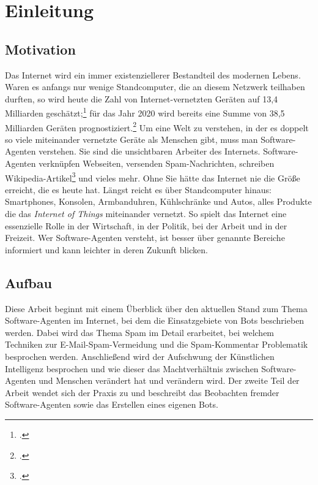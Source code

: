 \section{Einleitung}
\label{sec:einleitung}

\subsection{Motivation}
\label{sub:motivation}

Das Internet wird ein immer existenziellerer Bestandteil des modernen Lebens.
Waren es anfangs nur wenige Standcomputer, die an diesem Netzwerk teilhaben
durften, so wird heute die Zahl von Internet-vernetzten Geräten auf 13,4
Milliarden geschätzt;\footcite{iotTripleBy2020} für das Jahr 2020 wird bereits
eine Summe von 38,5 Milliarden Geräten
prognostiziert.\footcite{iotTripleBy2020} Um eine Welt zu verstehen, in der es
doppelt so viele miteinander vernetzte Geräte als Menschen gibt, muss man
Software-Agenten verstehen. Sie sind die unsichtbaren Arbeiter des Internets.
Software-Agenten verknüpfen Webseiten, versenden Spam-Nachrichten, schreiben
Wikipedia-Artikel\footcite{botWritingForWikipedia} und vieles mehr. Ohne Sie
hätte das Internet nie die Größe erreicht, die es heute hat. Längst reicht es
über Standcomputer hinaus: Smartphones, Konsolen, Armbanduhren, Kühlschränke
und Autos, alles Produkte die das \emph{Internet of Things} miteinander
vernetzt. So spielt das Internet eine essenzielle Rolle in der Wirtschaft, in
der Politik, bei der Arbeit und in der Freizeit. Wer Software-Agenten versteht,
ist besser über genannte Bereiche informiert und kann leichter in deren Zukunft
blicken.

\subsection{Aufbau}
\label{sub:aufbau}

Diese Arbeit beginnt mit einem Überblick über den aktuellen Stand zum Thema
Software-Agenten im Internet, bei dem die Einsatzgebiete von
Bots beschrieben werden. Dabei wird
das Thema Spam im Detail erarbeitet, bei welchem Techniken
zur E-Mail-Spam-Vermeidung und die
Spam-Kommentar Problematik besprochen werden.
Anschließend wird der Aufschwung der Künstlichen Intelligenz
besprochen und wie dieser das
Machtverhältnis zwischen Software-Agenten und Menschen verändert hat und
verändern wird. Der zweite Teil der Arbeit wendet sich der Praxis zu und
beschreibt das Beobachten fremder
Software-Agenten sowie das Erstellen
eines eigenen Bots.
